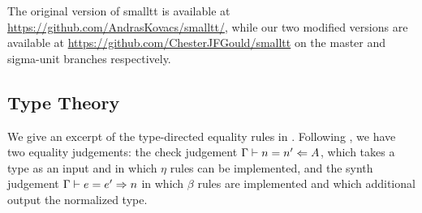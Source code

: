 

The original version of smalltt is available at \url{https://github.com/AndrasKovacs/smalltt/}, while our two modified versions are available at \url{https://github.com/ChesterJFGould/smalltt} on the master and sigma-unit branches respectively.

\subsection{Type Theory}

We give an excerpt of the type-directed equality rules in .
Following \citet{Chapman2005}, we have two equality judgements: the check judgement $\Gamma \vdash n = n' \Leftarrow A$, which takes a type as an input and in which $\eta$ rules can be implemented, and the synth judgement $\Gamma \vdash e = e' \Rightarrow n$ in which $\beta$ rules are implemented and which additional output the normalized type.

